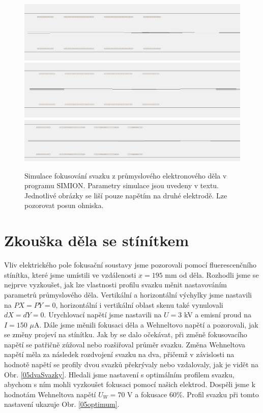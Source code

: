 \begin{figure}[htbp!]
\centering
\includegraphics[width = \textwidth]{Figure/05/1a.jpg}
\vfill
\vspace{0.22cm}
\includegraphics[width = \linewidth]{Figure/05/1b.jpg}
\vfill
\vspace{0.22cm}
\includegraphics[width = \linewidth]{Figure/05/1c.jpg}
\caption{Simulace fokusování svazku z průmyslového elektronového děla v programu SIMION. Parametry simulace jsou uvedeny v textu. Jednotlivé obrázky se liší pouze napětím na druhé elektrodě. Lze pozorovat posun ohniska.}
\label{05simulaceFinalniKonfigurace}
\end{figure}

\section{Zkouška děla se stínítkem}

Vliv elektrického pole fokusační soustavy jsme pozorovali pomocí fluerescenčního stínítka, které jsme umístili ve vzdálenosti $x = 195$ mm od děla. Rozhodli jsme se nejprve vyzkoušet, jak lze vlastnosti profilu svazku měnit nastavováním parametrů průmyslového děla. Vertikální a horizontální výchylky jsme nastavili na $PX = PY = 0$, horizontální i vertikální oblast skenu také vynulovali $dX = dY = 0$. Urychlovací napětí jsme nastavili na $U = 3$ kV a emisní proud na $I = 150$ $\mu$A. Dále jsme měnili fokusaci děla a Wehneltovo napětí a pozorovali, jak se změny projeví na stínítku. Jak by se dalo očekávat, při změně fokusovacího napětí se patřičně zúžoval nebo rozšiřoval průměr svazku. Změna Wehneltova napětí měla za následek rozdvojení svazku na dva, přičemž v závislosti na hodnotě napětí se profily dvou svazků překrývaly nebo vzdalovaly, jak je vidět na Obr. \ref{05dvaSvazky}. Hledali jsme nastavení s optimálním profilem svazku, abychom s ním mohli vyzkoušet fokusaci pomocí našich elektrod. Dospěli jsme k hodnotám Wehneltova napětí $U_W = 70$ V a fokusace 60\%. Profil svazku při tomto nastavení ukazuje Obr. \ref{05optimum}.\\

